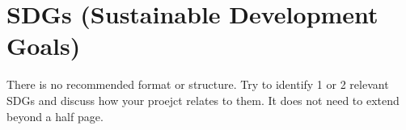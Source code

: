 \chapter{SDGs (Sustainable Development Goals)}

There is no recommended format or structure. Try to identify 1 or 2 relevant SDGs and discuss how your proejct relates to them. It does not need to extend beyond a half page.